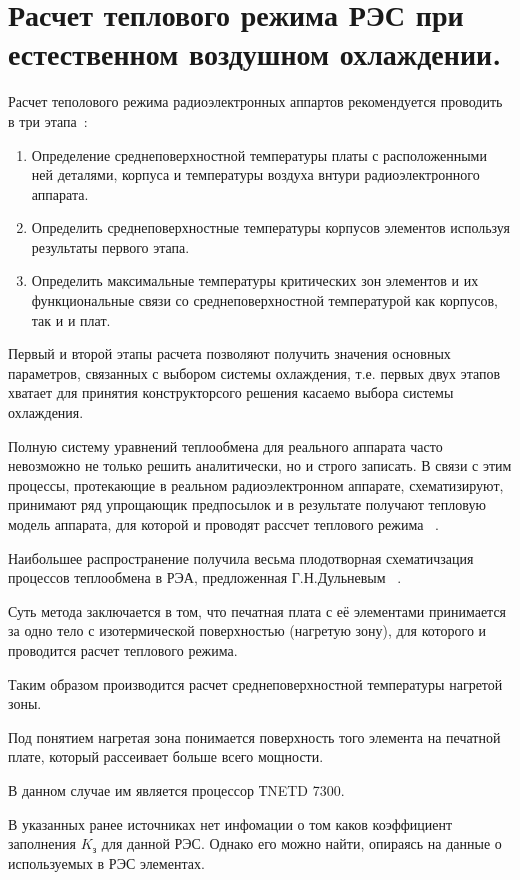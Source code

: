 \section{Расчет теплового режима РЭС при естественном воздушном охлаждении.}

Расчет теполового режима радиоэлектронных аппартов рекомендуется
проводить в три этапа~\cite{Rotkop1976}:
\begin{enumerate}[label={\arabic*.}]
  \item Определение среднеповерхностной температуры платы с
расположенными ней деталями, корпуса и температуры воздуха внтури
радиоэлектронного аппарата.
  \item Определить среднеповерхностные температуры корпусов элементов
  используя результаты первого этапа.
  \item Определить максимальные температуры критических зон элементов и
их функциональные связи со среднеповерхностной температурой как
корпусов, так и и плат.
\end{enumerate}

Первый и второй этапы расчета позволяют получить значения основных
параметров, связанных с выбором системы охлаждения, т.е. первых двух
этапов хватает для принятия конструкторсого решения касаемо выбора
системы охлаждения.

Полную систему уравнений теплообмена для реального аппарата часто
невозможно не только решить аналитически, но и строго записать. В
связи с этим процессы, протекающие в реальном радиоэлектронном
аппарате, схематизируют, принимают ряд упрощающик предпосылок и в
результате получают тепловую модель аппарата, для которой и проводят
рассчет теплового режима ~\cite{Rotkop1976}.

Наибольшее распространение получила весьма плодотворная схематичзация
процессов теплообмена в РЭА, предложенная Г.Н.Дульневым
~\cite{Dulnev1968}.

Суть метода заключается в том, что печатная плата с её элементами
принимается за одно тело с изотермической поверхностью (нагретую
зону), для которого и проводится расчет теплового режима.

Таким образом производится расчет среднеповерхностной температуры
нагретой зоны.

Под понятием нагретая зона понимается поверхность того элемента на
печатной плате, который рассеивает больше всего мощности.

В данном случае им является процессор ТNETD 7300.

В указанных ранее источниках нет инфомации о том каков коэффициент
заполнения $K_\mathrm{з}$ для данной РЭС. Однако его можно найти,
опираясь на данные о используемых в РЭС элементах.

